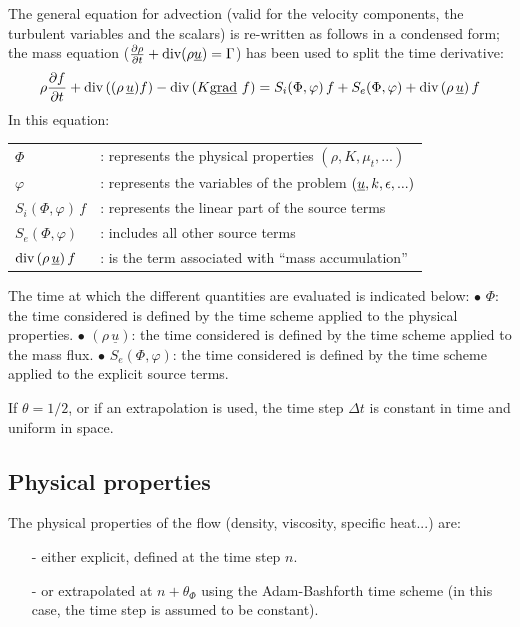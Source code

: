 The general equation for advection (valid for the velocity components, the
turbulent variables and the scalars) is re-written as follows in a condensed
form; the mass equation ($\frac{\partial \rho } {\partial t}+ \text{div}(\rho
\underline{u}) = \Gamma$) has been used to split the time derivative:
\begin{equation}  \label{Base_Introd_simple}
\rho \frac {\partial f}{\partial t} + \dive\,((\rho\,\underline{u}) f) - %
\dive\,(K \grad f) = S_{i}(\Phi,\varphi)\,f + S_{e}(\Phi,\varphi) + \dive%
\,(\rho\,\underline{u})\,f
\end{equation}
In this equation:\newline
\begin{tabular}{ll}
$\Phi$ & : represents the physical properties $(\rho,K,\mu_{t},...)$ \\
$\varphi$ & : represents the variables of the problem $(\vect{u}%
,k,\epsilon,...)$ \\
$S_{i}(\Phi,\varphi)\,f$ & : represents the linear part of the source terms
\\
$S_{e}(\Phi,\varphi)$ & : includes all other source terms \\
$\text{div}\,(\rho\,\underline{u})\,f$ & : is the term associated with ``mass
accumulation''%
\end{tabular}
\newline
\newline

The time at which the different quantities are evaluated is indicated below:%
\newline
$\bullet$ $\Phi$: the time considered is defined by the time scheme applied
to the physical properties.\newline
$\bullet$ $(\rho\,\underline{u})$: the time considered is defined by the
time scheme applied to the mass flux.\newline
$\bullet$ $S_{e}(\Phi,\varphi)$: the time considered is defined by the time
scheme applied to the explicit source terms.

If $\theta=1/2$, or if an extrapolation is used, the time step $\Delta t$ is
constant in time and uniform in space.

\subsection{Physical properties}

The physical properties of the flow (density, viscosity, specific heat...)
are:

\begin{itemize}
\item[-] either explicit, defined at the time step $n$.

\item[-] or extrapolated at $n+\theta _{\Phi }$ using the Adam-Bashforth
time scheme (in this case, the time step is assumed to be constant).
\end{itemize}

